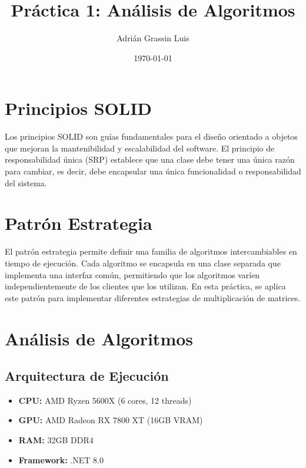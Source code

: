 \documentclass[11pt]{article}
\begin{document}
\title{Práctica 1: Análisis de Algoritmos}
\author{Adrián Grassin Luis}
\date{\today}

\maketitle

\section{Principios SOLID}
Los principios SOLID son guías fundamentales para el diseño orientado a objetos que mejoran la mantenibilidad y escalabilidad del software. El principio de responsabilidad única (SRP) establece que una clase debe tener una única razón para cambiar, es decir, debe encapsular una única funcionalidad o responsabilidad del sistema.

\section{Patrón Estrategia}
El patrón estrategia permite definir una familia de algoritmos intercambiables en tiempo de ejecución. Cada algoritmo se encapsula en una clase separada que implementa una interfaz común, permitiendo que los algoritmos varíen independientemente de los clientes que los utilizan. En esta práctica, se aplica este patrón para implementar diferentes estrategias de multiplicación de matrices.

\section{Análisis de Algoritmos}

\subsection{Arquitectura de Ejecución}
\begin{itemize}
    \item \textbf{CPU:} AMD Ryzen 5600X (6 cores, 12 threads)
    \item \textbf{GPU:} AMD Radeon RX 7800 XT (16GB VRAM)
    \item \textbf{RAM:} 32GB DDR4
    \item \textbf{Framework:} .NET 8.0
\end{itemize}
\end{document}
